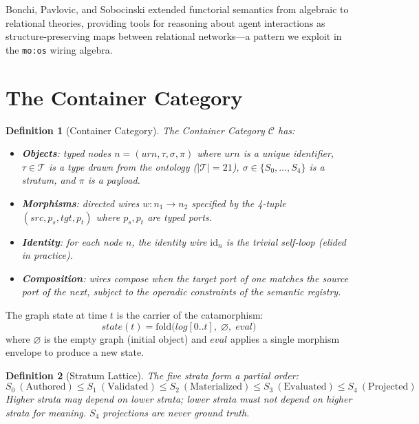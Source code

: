 \documentclass[submission,copyright,creativecommons]{eptcs}
\newtheorem{definition}{Definition}
\begin{document}
Bonchi, Pavlovic, and Sobocinski \cite{bonchi2017functorial} extended
functorial semantics from algebraic to relational theories, providing tools for
reasoning about agent interactions as structure-preserving maps between
relational networks---a pattern we exploit in the \texttt{mo:os} wiring
algebra.

\section{The Container Category}
\label{sec:container}

\begin{definition}[Container Category]
The \emph{Container Category} $\mathcal{C}$ has:
\begin{itemize}
  \item \textbf{Objects}: typed nodes $n = (\mathit{urn}, \tau, \sigma, \pi)$
        where $\mathit{urn}$ is a unique identifier, $\tau \in \mathcal{T}$ is
        a type drawn from the ontology ($|\mathcal{T}| = 21$), $\sigma \in
        \{S_0, \ldots, S_4\}$ is a stratum, and $\pi$ is a payload.
  \item \textbf{Morphisms}: directed wires $w\colon n_1 \to n_2$ specified by
        the 4-tuple $(\mathit{src}, p_s, \mathit{tgt}, p_t)$ where $p_s, p_t$
        are typed ports.
  \item \textbf{Identity}: for each node $n$, the identity wire
        $\mathrm{id}_n$ is the trivial self-loop (elided in practice).
  \item \textbf{Composition}: wires compose when the target port of one matches
        the source port of the next, subject to the operadic constraints of
        the semantic registry.
\end{itemize}
\end{definition}

The graph state at time $t$ is the carrier of the catamorphism:
\begin{equation}
\label{eq:cata}
\mathit{state}(t) = \mathrm{fold}\bigl(\mathit{log}[0..t],\; \varnothing,\;
\mathit{eval}\bigr)
\end{equation}
where $\varnothing$ is the empty graph (initial object) and $\mathit{eval}$
applies a single morphism envelope to produce a new state.

\begin{definition}[Stratum Lattice]
The five strata form a partial order:
\[
S_0\ (\text{Authored}) \leq S_1\ (\text{Validated}) \leq S_2\
(\text{Materialized}) \leq S_3\ (\text{Evaluated}) \leq S_4\ (\text{Projected})
\]
Higher strata may depend on lower strata; lower strata must not depend on
higher strata for meaning. $S_4$ projections are never ground truth.
\end{definition}
\end{document}
